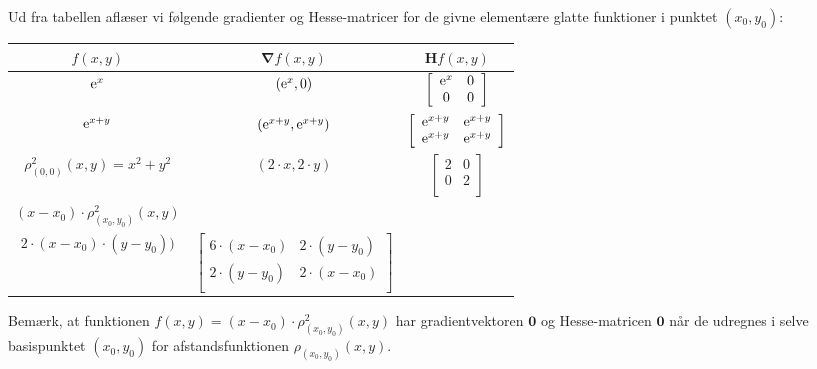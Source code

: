 \begin{example}\label{exampGradHessElem}
Ud fra tabellen aflæser vi følgende gradienter og Hesse-matricer for de givne elementære glatte funktioner i punktet $(x_{0}, y_{0})$:

\begin{center}
\begin{tabular}{|c|c|c|} \hline
$ f(x,y) $ & $ \bm{\nabla}f(x, y) $ & $ \mathbf{H}f(x, y) $ \\ \hline \hline
$ \mathrm{e}^{x} $ & $ (\mathrm{e}^{x}, 0) $ & $ \left[ \begin{array}{cc} \mathrm{e}^{x} & 0 \\ 0 & 0 \\ \end{array} \right] $ \\ \hline
$ \mathrm{e}^{x+y} $ & $ (\mathrm{e}^{x+y},\mathrm{e}^{x+y}) $ & $ \left[ \begin{array}{cc}\mathrm{e}^{x+y} & \mathrm{e}^{x+y} \\  \mathrm{e}^{x+y} & \mathrm{e}^{x+y} \\ \end{array} \right] $ \\ \hline
$ \rho^{2}_{(0,0)}(x,y) = x^{2} + y^{2} $ & $ (2\cdot x, 2 \cdot y) $ & $ \left[\begin{array}{cc} 2 & 0 \\  0 & 2 \\ \end{array}\right] $ \\ \hline
$ (x-x_{0}) \cdot \rho^{2}_{(x_{0}, y_{0})}(x,y) $ & \begin{minipage}{4.3cm} $ (3\cdot (x-x_{0})^{2} + (y-y_{0})^{2}, $ \\ $ 2 \cdot (x-x_{0})\cdot(y-y_{0})) $ \end{minipage} & $ \left[ \begin{array}{cc} 6\cdot (x-x_{0}) & 2\cdot(y-y_{0}) \\ 2\cdot(y-y_{0})  & 2\cdot(x-x_{0})  \\ \end{array} \right] $ \\ \hline \hline
\end{tabular}
\end{center}
\end{example}

\begin{aha}
Bemærk, at funktionen $f(x,y) = (x-x_{0}) \cdot \rho^{2}_{(x_{0}, y_{0})}(x,y)$ har gradientvektoren $\bm{0}$ og Hesse-matricen $\bm{0}$ når de udregnes i selve basispunktet $(x_{0}, y_{0})$ for afstandsfunktionen $\rho_{(x_{0}, y_{0})}(x,y)$.
\end{aha}


